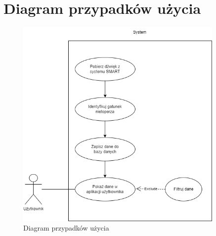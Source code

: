 \documentclass{sprz}
\begin{document}
\clearpage

\section{Diagram przypadków użycia}
\begin{figure}[h]
  \centering
  \includegraphics[width=0.9\textwidth]{sprz/use-case}
  \caption{Diagram przypadków użycia}
  \label{img:use-case}
\end{figure}

\clearpage

\printbibliography[title={Bibliografia}, heading=bibintoc]
\end{document}

